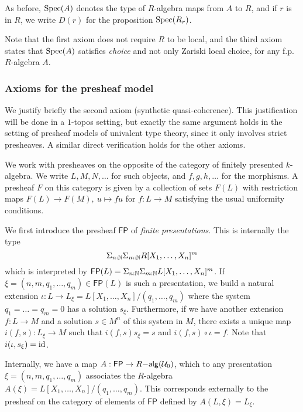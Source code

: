 As before, $\operatorname{Spec}(A)$ denotes the type of $R$-algebra maps from $A$ to $R$, and
if $r$ is in $R$, we write $D(r)$ for the proposition $\operatorname{Spec}(R_r)$.

Note that the first axiom does not require
$R$ to be local, and the third axiom states that $\operatorname{Spec}(A)$ satisfies \emph{choice} and not only Zariski local choice,
for any f.p. $R$-algebra $A$.


\subsubsection{Axioms for the presheaf model}

\newcommand{\FP}{\mathsf{FP}}

We justify briefly the second axiom (synthetic quasi-coherence). This justification will be done
in a $1$-topos setting, but exactly the same argument holds in the setting of presheaf models of
univalent type theory, since it only involves strict presheaves. A similar direct verification holds
for the other axioms.

We work with presheaves on the opposite of the category of finitely presented $k$-algebra. We write
$L,M,N,\dots$ for such objects, and $f,g,h,\dots$ for the morphisms. A presheaf $F$ on this category is given
by a collection of sets $F(L)$ with restriction maps $F(L)\rightarrow F(M),~u\mapsto f u$ for
$f:L\rightarrow M$ satisfying the usual uniformity conditions.

We first introduce the presheaf $\FP$ of {\em finite presentations}. This is internally the type
$$
\Sigma_{n:\mathbb{N}}\Sigma_{m:\mathbb{N}}R[X_1,\dots,X_n]^m
$$
which is interpreted by $\FP(L) = \Sigma_{n:\nats}\Sigma_{m:\nats}L[X_1,\dots,X_n]^m$.
If $\xi = (n,m,q_1,\dots,q_m)\in\FP(L)$ is such a presentation, we build a natural extension
$\iota:L\rightarrow L_{\xi} = L[X_1,\dots,X_n]/(q_1,\dots,q_m)$ where the system $q_1 = \dots = q_m = 0$
has a solution $s_{\xi}$. Furthermore, if we have another extension $f:L\rightarrow M$
and a solution $s\in M^n$ of this system in $M$, there exists a unique map $i(f,s):L_{\xi}\rightarrow M$
such that $i(f,s) s_{\xi} = s$ and $i(f,s)\circ \iota = f$.
Note that $i(\iota,s_{\xi}) = \mathrm{id}$.

\medskip

Internally, we have a map $A:\FP\rightarrow R\mathsf{-alg}(\UU_0)$, which to any presentation
$\xi = (n,m,q_1,\dots,q_m)$ associates the $R$-algebra $A(\xi) = L[X_1,\dots,X_n]/(q_1,\dots,q_m)$.
This corresponds externally to the presheaf on the category of elements of $\FP$ defined
by $A(L,\xi) = L_{\xi}$.

